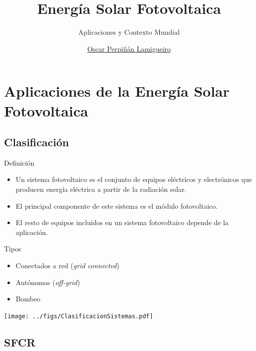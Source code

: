 \documentclass[xcolor={usenames,svgnames,dvipsnames}]{beamer}
\author{\href{https://oscarperpinan.github.io}{Oscar Perpiñán Lamigueiro}}
\date{}
\title{Energía Solar Fotovoltaica}
\subtitle{Aplicaciones y Contexto Mundial}
\institute[UPM]{Universidad Politécnica de Madrid}
\begin{document}
\maketitle

\section{Aplicaciones de la Energía Solar Fotovoltaica}
\label{sec:org87914dd}

\subsection{Clasificación}
\label{sec:org7f1ed41}

\begin{frame}[label={sec:orgecd78bc}]{Definición}
\begin{itemize}
\item Un sistema fotovoltaico es el conjunto de equipos eléctricos y
electrónicos que producen energía eléctrica a partir de la radiación
solar.

\item El principal componente de este sistema es el módulo fotovoltaico.

\item El resto de equipos incluidos en un sistema fotovoltaico depende de la aplicación.
\end{itemize}

\begin{block}{Tipos}
\begin{itemize}
\item Conectados a red (\emph{grid connected})

\item Autónomos (\emph{off-grid})

\item Bombeo
\end{itemize}
\end{block}
\end{frame}

\begin{frame}[label={sec:org0b67159}]{}
\begin{center}
\texttt{[image: ../figs/ClasificacionSistemas.pdf]}
\end{center}
\end{frame}

\subsection{SFCR}
\label{sec:org0ea52c3}
\end{document}
